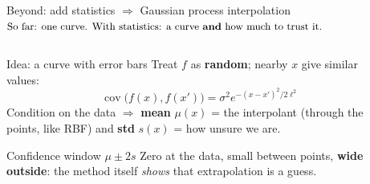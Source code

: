\documentclass[aspectratio=169]{beamer}
\newcommand{\cbox}[2]{\colorbox{#1}{\ensuremath{\displaystyle #2}}}
\begin{document}
\begin{frame}{Beyond: add statistics $\Rightarrow$ Gaussian process interpolation}
\centering
\cbox{accent!12}{\text{\small So far: one curve. With statistics: a curve \textbf{and} how much to trust it.}}
\vspace{0.3em}

\begin{columns}[T]
\begin{column}{0.44\textwidth}
\small
\begin{block}{Idea: a curve with error bars}
\footnotesize
Treat $f$ as \textbf{random}; nearby $x$ give similar values:
\[ \operatorname{cov}\big(f(x),f(x')\big)=\sigma^2 e^{-(x-x')^2/2\ell^2} \]
Condition on the data $\Rightarrow$ \textbf{mean} $\mu(x)$ = the interpolant (through the points, like RBF) and \textbf{std} $s(x)$ = how unsure we are.
\end{block}
\begin{exampleblock}{Confidence window $\mu \pm 2s$}
\footnotesize
Zero at the data, small between points, \textbf{wide outside}: the method itself \emph{shows} that extrapolation is a guess.
\end{exampleblock}
\end{column}
\begin{column}{0.54\textwidth}
\centering
{}
\end{column}
\end{columns}
\end{frame}
\end{document}
